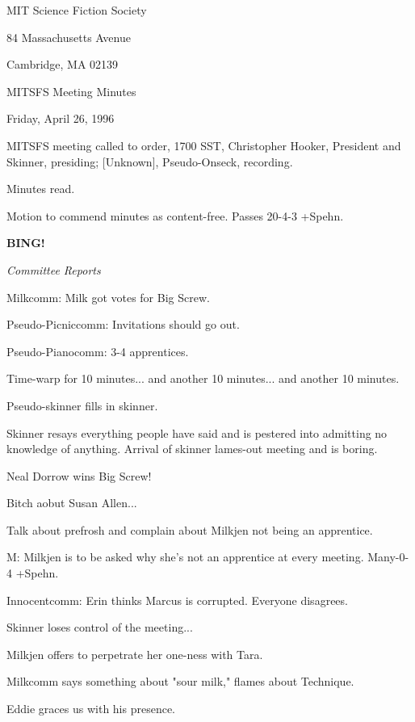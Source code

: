 \documentclass[12pt]{article}
\newcommand{\bing}{{\bf BING!} }
\newcommand{\goto}[1]{\bing \vskip 12pt \centerline{{\em{#1}}}}
\begin{document}
\begin{center}

MIT Science Fiction Society 

84 Massachusetts Avenue

Cambridge, MA 02139

\vspace{12pt}

MITSFS Meeting Minutes 

Friday, April 26, 1996

\end{center}
 
\vspace{18pt}

\setlength{\parskip}{6pt}

\noindent
MITSFS meeting called to order, 1700 SST,
Christopher Hooker, President and Skinner, presiding; [Unknown], Pseudo-Onseck, recording.

Minutes read.

Motion to commend minutes as content-free. Passes 20-4-3 +Spehn.

\goto{Committee Reports}

Milkcomm: Milk got votes for Big Screw.

Pseudo-Picniccomm: Invitations should go out.

Pseudo-Pianocomm: 3-4 apprentices.

Time-warp for 10 minutes... and another 10 minutes... and another 10 minutes.

Pseudo-skinner fills in skinner.

Skinner resays everything people have said and is pestered into admitting no knowledge of anything. Arrival of skinner lames-out meeting and is boring.

Neal Dorrow wins Big Screw!

Bitch aobut Susan Allen...

Talk about prefrosh and complain about Milkjen not being an apprentice.

M: Milkjen is to be asked why she's not an apprentice at every meeting. Many-0-4 +Spehn.

Innocentcomm: Erin thinks Marcus is corrupted. Everyone disagrees.

Skinner loses control of the meeting...

Milkjen offers to perpetrate her one-ness with Tara.

Milkcomm says something about "sour milk," flames about Technique.

Eddie graces us with his presence.
\end{document}
